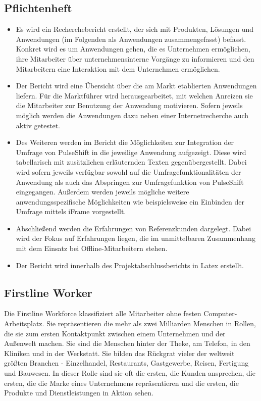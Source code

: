\subsection{Pflichtenheft}
\begin{itemize}
\item Es wird ein Recherchebericht erstellt, der sich mit Produkten, Lösungen und Anwendungen (im Folgenden als Anwendungen zusammengefasst) befasst. Konkret wird es um Anwendungen gehen, die es Unternehmen ermöglichen, ihre Mitarbeiter über unternehmensinterne Vorgänge zu informieren und den Mitarbeitern eine Interaktion mit dem Unternehmen ermöglichen.
\item Der Bericht wird eine Übersicht über die am Markt etablierten Anwendungen liefern. Für die Marktführer wird herausgearbeitet, mit welchen Anreizen sie die Mitarbeiter zur Benutzung der Anwendung motivieren. Sofern jeweils möglich werden die Anwendungen dazu neben einer Internetrecherche auch aktiv getestet.
\item Des Weiteren werden im Bericht die Möglichkeiten zur Integration der Umfrage von PulseShift in die jeweilige Anwendung aufgezeigt. Diese wird tabellarisch mit zusätzlichen erläuternden Texten gegenübergestellt. Dabei wird sofern jeweils verfügbar sowohl auf die Umfragefunktionalitäten der Anwendung als auch das Abspringen zur Umfragefunktion von PulseShift eingegangen. Außerdem werden jeweils mögliche weitere anwendungsspezifische Möglichkeiten wie beispielsweise ein Einbinden der Umfrage mittels iFrame vorgestellt.
\item Abschließend werden die Erfahrungen von Referenzkunden dargelegt. Dabei wird der Fokus auf Erfahrungen liegen, die im unmittelbaren Zusammenhang mit dem Einsatz bei Offline-Mitarbeitern stehen.
\item Der Bericht wird innerhalb des Projektabschlussberichts in Latex erstellt.
\end{itemize}


\subsection{Firstline Worker}

Die Firstline Workforce klassifiziert alle Mitarbeiter ohne festen Computer-Arbeits\-platz. Sie repräsentieren die mehr als zwei Milliarden Menschen  in Rollen, die sie zum ersten Kontaktpunkt zwischen einem Unternehmen und der Außenwelt machen. Sie sind die Menschen hinter der Theke, am Telefon, in den Kliniken und in der Werkstatt. Sie bilden das Rückgrat vieler der weltweit größten Branchen - Einzelhandel, Restaurants, Gastgewerbe, Reisen, Fertigung und Bauwesen. In dieser Rolle sind sie oft die ersten, die Kunden ansprechen, die ersten, die die Marke eines Unternehmens repräsentieren und die ersten, die Produkte und Dienstleistungen in Aktion sehen.


